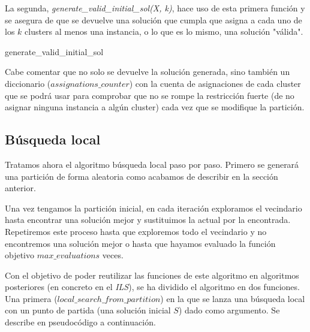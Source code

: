 \documentclass[11pt,a4paper]{article}
\begin{document}
	La segunda, \textit{generate\_valid\_initial\_sol(X, k)}, hace uso de esta primera función y se asegura de que se devuelve una solución que cumpla que asigna a cada uno de los $k$ clusters al menos una instancia, o lo que es lo mismo, una solución "válida".
	
	\begin{algorithm}[H]
	 	\caption{generate\_valid\_initial\_sol}
	\end{algorithm}
	Cabe comentar que no solo se devuelve la solución generada, sino también un diccionario ($assignations\_counter$) con la cuenta de asignaciones de cada cluster que se podrá usar para comprobar que no se rompe la restricción fuerte (de no asignar ninguna instancia a algún cluster) cada vez que se modifique la partición.
	
	\subsection{Búsqueda local}
	
	Tratamos ahora el algoritmo búsqueda local paso por paso. Primero se generará una partición de forma aleatoria como acabamos de describir en la sección anterior.
	
	Una vez tengamos la partición inicial, en cada iteración exploramos el vecindario hasta encontrar una solución mejor y sustituimos la actual por la encontrada. Repetiremos este proceso hasta que exploremos todo el vecindario y no encontremos una solución mejor o hasta que hayamos evaluado la función objetivo $max\_evaluations$ veces.
	
	Con el objetivo de poder reutilizar las funciones de este algoritmo en algoritmos posteriores (en concreto en el \textit{ILS}), se ha dividido el algoritmo en dos funciones. Una primera ($local\_search\_from\_partition$) en la que se lanza una búsqueda local con un punto de partida (una solución inicial $S$) dado como argumento. Se describe en pseudocódigo a continuación.
	
\end{document}
